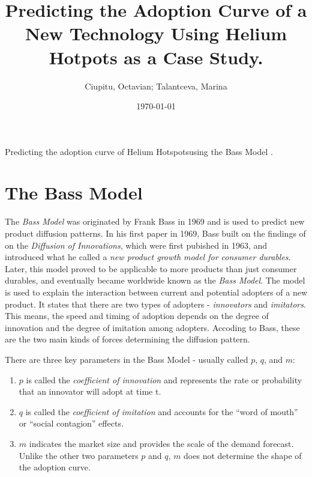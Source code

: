 \documentclass{article}
\title{Predicting the Adoption Curve of a New Technology Using Helium Hotpots as a Case Study.}
\author{Ciupitu, Octavian; Talantceva, Marina}
\begin{document}
\date{\today}
\maketitle

\begin{center}
    Predicting the adoption curve of Helium Hotspotsusing the Bass Model \citep{bass1969new}.
\end{center}
  

\section{The Bass Model}

The \emph{Bass Model} was originated by Frank Bass in 1969 and is used to predict new product diffusion patterns. In his first paper
in 1969, Bass built on the findings of \cite{rogers2014diffusion} on the \emph{Diffusion of Innovations}, which were first pubished in 1963,
and introduced what he called a \emph{new product growth model for consumer durables}. Later, this model proved to be applicable to more
products than just consumer durables, and eventually became worldwide known as the \emph{Bass Model}. The model is used to explain the
interaction between current and potential adopters of a new product. It states that there are two types of adopters - \emph{innovators} and
\emph{imitators}. This means, the speed and timing of adoption depends on the degree of innovation and the degree of imitation among adopters.
Accoding to Bass, these are the two main kinds of forces determining the diffusion pattern.

\medskip

\noindent There are three key parameters in the Bass Model - usually called $p$, $q$, and $m$:

\begin{enumerate}
    \item $p$ is called the \emph{coefficient of innovation} and represents the rate or probability that an innovator will adopt at time t. 
    \item $q$ is called the \emph{coefficient of imitation} and accounts for the “word of mouth” or “social contagion” effects.
    \item $m$ indicates the market size and provides the scale of the demand forecast. Unlike the other two parameters $p$ and $q$,
    $m$ does not determine the shape of the adoption curve. 
\end{enumerate}
\end{document}
